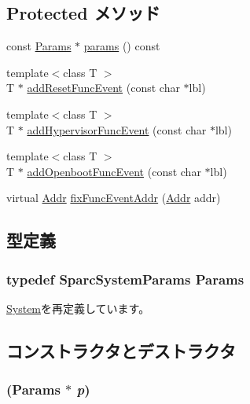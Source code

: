\subsection*{Protected メソッド}
\begin{DoxyCompactItemize}
\item 
const \hyperlink{classSparcSystem_ad1d7d4179ae16224e8ae3360e3e676b8}{Params} $\ast$ \hyperlink{classSparcSystem_acd3c3feb78ae7a8f88fe0f110a718dff}{params} () const 
\item 
{\footnotesize template$<$class T $>$ }\\T $\ast$ \hyperlink{classSparcSystem_ac772c1ca4822ba2a88be95ef2d3fdf1f}{addResetFuncEvent} (const char $\ast$lbl)
\item 
{\footnotesize template$<$class T $>$ }\\T $\ast$ \hyperlink{classSparcSystem_aeac22b2a8ad8eb00deb0c28b42437633}{addHypervisorFuncEvent} (const char $\ast$lbl)
\item 
{\footnotesize template$<$class T $>$ }\\T $\ast$ \hyperlink{classSparcSystem_abe429690e878f6801b670e0a269151ad}{addOpenbootFuncEvent} (const char $\ast$lbl)
\item 
virtual \hyperlink{base_2types_8hh_af1bb03d6a4ee096394a6749f0a169232}{Addr} \hyperlink{classSparcSystem_aff94f650c5eef23b8dc350ea755bdef4}{fixFuncEventAddr} (\hyperlink{base_2types_8hh_af1bb03d6a4ee096394a6749f0a169232}{Addr} addr)
\end{DoxyCompactItemize}


\subsection{型定義}
\hypertarget{classSparcSystem_ad1d7d4179ae16224e8ae3360e3e676b8}{
\subsubsection[{Params}]{\setlength{\rightskip}{0pt plus 5cm}typedef SparcSystemParams {\bf Params}}}
\label{classSparcSystem_ad1d7d4179ae16224e8ae3360e3e676b8}


\hyperlink{classSystem_a5f461be6222ce76bffcb70f27d820c56}{System}を再定義しています。

\subsection{コンストラクタとデストラクタ}
\hypertarget{classSparcSystem_aaedf354aedeab4df3588563074335ab9}{
\subsubsection[{SparcSystem}]{ ({\bf Params} $\ast$ {\em p})}}
\label{classSparcSystem_aaedf354aedeab4df3588563074335ab9}


